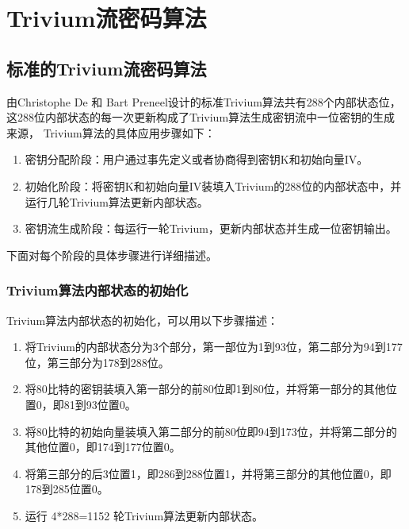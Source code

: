 
\chapter{Trivium流密码算法}

\section{标准的Trivium流密码算法}

由Christophe De 和 Bart Preneel设计的标准Trivium算法共有288个内部状态位，这288位内部状态的每一次更新构成了Trivium算法生成密钥流中一位密钥的生成来源， Trivium算法的具体应用步骤如下：

\begin{enumerate}[noitemsep,topsep=0pt,parsep=0pt,partopsep=0pt]
  \item 密钥分配阶段：用户通过事先定义或者协商得到密钥K和初始向量IV。
  \item 初始化阶段：将密钥K和初始向量IV装填入Trivium的288位的内部状态中，并运行几轮Trivium算法更新内部状态。
  \item 密钥流生成阶段：每运行一轮Trivium，更新内部状态并生成一位密钥输出。
\end{enumerate}

下面对每个阶段的具体步骤进行详细描述。

\subsection{Trivium算法内部状态的初始化}

Trivium算法内部状态的初始化，可以用以下步骤描述：

\begin{enumerate}[noitemsep,topsep=0pt,parsep=0pt,partopsep=0pt]
  \item 将Trivium的内部状态分为3个部分，第一部位为1到93位，第二部分为94到177位，第三部分为178到288位。
  \item 将80比特的密钥装填入第一部分的前80位即1到80位，并将第一部分的其他位置0，即81到93位置0。
  \item 将80比特的初始向量装填入第二部分的前80位即94到173位，并将第二部分的其他位置0，即174到177位置0。
  \item 将第三部分的后3位置1，即286到288位置1，并将第三部分的其他位置0，即178到285位置0。
  \item 运行 4*288=1152 轮Trivium算法更新内部状态。
\end{enumerate}


